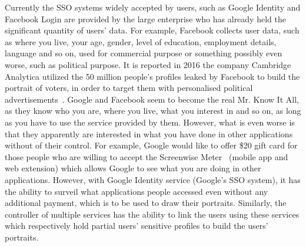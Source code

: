 Currently the SSO systems widely accepted by users, such as Google Identity and Facebook Login are provided by the large enterprise who has already held the significant quantity of users' data. For example, Facebook collects user data, such as where you live, your age, gender, level of education, employment details, language and so on, used for commercial purpose or something possibly even worse, such as political purpose. It is reported in 2016 the company Cambridge Analytica utilized the 50 million people's profiles leaked by Facebook to build the portrait of voters, in order to target them with personalised political advertisements~\cite{facebooknews}. Google and Facebook seem to become the real Mr. Know It All, as they know who you are, where you live, what you interest in and so on, as long as you have to use the service provided by them. However, what is even worse is that they apparently are interested in what you have done in other applications without of their control. For example, Google would like to offer \$20 gift card for those people who are willing to accept the Screenwise Meter~\cite{googlenews} (mobile app and web extension) which allows Google to see what you are doing in other applications. However, with Google Identity service (Google's SSO system), it has the ability to surveil what applications people accessed even without any additional payment, which is to be used to draw their portraits. Similarly, the controller of multiple services has the ability to link the users using these services which respectively hold partial users' sensitive profiles to build the users' portraits. 




